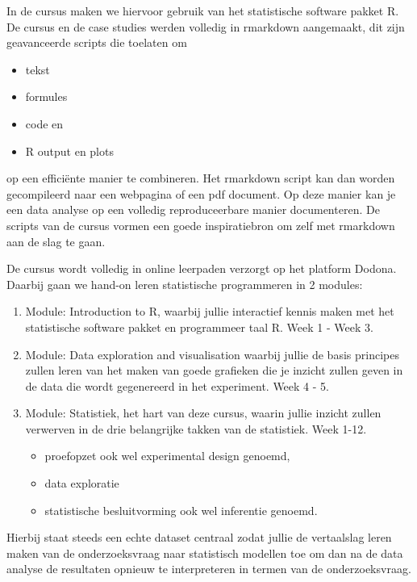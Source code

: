 \documentclass[
  12pt,dutch,coursenotes]{book}
\providecommand{\tightlist}{%
  \setlength{\itemsep}{0pt}\setlength{\parskip}{0pt}}
\theoremstyle{definition}
\theoremstyle{definition}
\theoremstyle{definition}
\theoremstyle{definition}
\theoremstyle{remark}
\begin{document}
In de cursus maken we hiervoor gebruik van
het statistische software pakket R. De cursus en de case studies werden volledig in rmarkdown aangemaakt, dit zijn geavanceerde scripts die toelaten om

\begin{itemize}
\tightlist
\item
  tekst
\item
  formules
\item
  code en
\item
  R output en plots
\end{itemize}

op een efficiënte manier te combineren. Het rmarkdown script kan dan worden gecompileerd naar een webpagina of een pdf document. Op deze manier kan je een data analyse op een volledig reproduceerbare manier documenteren. De scripts van de cursus vormen een goede inspiratiebron om zelf met rmarkdown aan de slag te gaan.

De cursus wordt volledig in online leerpaden verzorgt op het platform Dodona.
Daarbij gaan we hand-on leren statistische programmeren in 2 modules:

\begin{enumerate}
\def\labelenumi{\arabic{enumi}.}
\item
  Module: Introduction to R, waarbij jullie interactief kennis maken met het statistische software pakket en programmeer taal R. Week 1 - Week 3.
\item
  Module: Data exploration and visualisation waarbij jullie de basis principes zullen leren van het maken van goede grafieken die je inzicht zullen geven in de data die wordt gegenereerd in het experiment. Week 4 - 5.
\item
  Module: Statistiek, het hart van deze cursus, waarin jullie inzicht zullen verwerven in de drie belangrijke takken van de statistiek. Week 1-12.

  \begin{itemize}
  \tightlist
  \item
    proefopzet ook wel experimental design genoemd,
  \item
    data exploratie
  \item
    statistische besluitvorming ook wel inferentie genoemd.
  \end{itemize}
\end{enumerate}

Hierbij staat steeds een echte dataset centraal zodat jullie de vertaalslag leren maken van de onderzoeksvraag naar statistisch modellen toe om dan na de data analyse de resultaten opnieuw te interpreteren in termen van de onderzoeksvraag.
\end{document}
